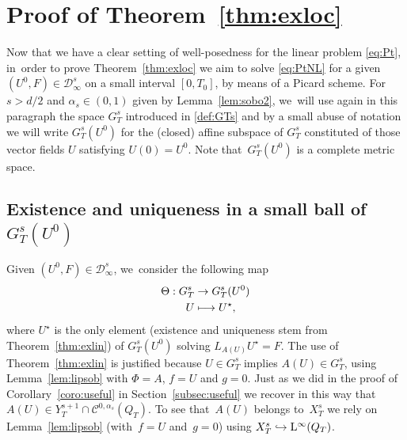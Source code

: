\documentclass[JEP,XML,SOM,Unicode,published]{cedram}
\newcommand\mto{\mathchoice{\longmapsto}{\mapsto}{\mapsto}{\mapsto}}
\newcommand\hto{\mathrel{\lhook\joinrel\to}}
\theoremstyle{definition}
\renewcommand\L{\mathrm{L}}
\begin{document}
\section{Proof of Theorem~\ref{thm:exloc}}\label{sec:road}

Now that we have a clear setting of well-posedness for the linear problem \eqref{eq:Pt}, in~order to prove Theorem~\ref{thm:exloc} we aim to solve \eqref{eq:PtNL} for a given $(U^0,F)\in \mathcal D_\infty^s$ on a small interval $[0,T_0]$, by means of a Picard scheme. For $s>d/2$ and $\alpha_s\in(0,1)$ given by Lemma~\ref{lem:sobo2}, we~will use again in this paragraph the space $G_T^s$ introduced in \eqref{def:GTs} and by a small abuse of notation we will write $G_T^s(U^0)$ for the (closed) affine subspace of $G_T^s$ constituted of those vector fields $U$ satisfying $U(0)=U^0$. Note that~$G_T^s(U^0)$ is a complete metric space.

\subsection{Existence and uniqueness in a small ball of $G_T^s(U^0)$}\label{subsec:exunismall}
Given $(U^0,F)\in \mathcal D_\infty^s$, we~consider the following map\vspace*{-3pt}
\begin{align*}
\Theta: G_T^s &\to G_T^s(U^0) \\
U &\mto U^\star,
\end{align*}
where $U^\star$ is the only element (existence and uniqueness stem from Theorem~\ref{thm:exlin}) of $G_T^s(U^0)$ solving $L_{A(U)} U^\star = F$. The use of Theorem~\ref{thm:exlin} is justified because $U\in G_T^s$ implies $A(U)\in G_T^s$, using Lemma~\ref{lem:lipsob} with $\Phi=A$, $f=U$ and $g=0$. Just as we did in the proof of Corollary~\ref{coro:useful} in Section~\ref{subsec:useful} we recover in this way that $A(U)\in Y_T^{s+1} \cap \mathscr{C}^{0,\alpha_s}(Q_T)$. To see that~$A(U)$ belongs to~$ X_T^s$ we rely on Lemma~\ref{lem:lipsob} (with~$f = U$ and~$g = 0$) using $X_T^s\hto\L^\infty(Q_T)$.
\end{document}
